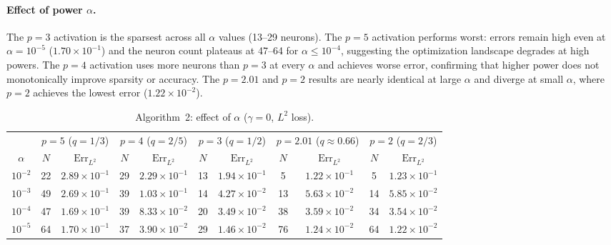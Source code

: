 \documentclass[12pt,fleqn]{amsart}
\theoremstyle{definition}
\begin{document}
\paragraph{\textbf{Effect of power $\alpha$}.}
The $p = 3$ activation is the sparsest across all $\alpha$ values (13--29 neurons).
The $p = 5$ activation performs worst: errors remain high even at $\alpha = 10^{-5}$ ($1.70 \times 10^{-1}$) and the neuron count plateaus at 47--64 for $\alpha \leqslant 10^{-4}$, suggesting the optimization landscape degrades at high powers.
The $p = 4$ activation uses more neurons than $p = 3$ at every $\alpha$ and achieves worse error, confirming that higher power does not monotonically improve sparsity or accuracy.
The $p = 2.01$ and $p = 2$ results are nearly identical at large $\alpha$ and diverge at small $\alpha$, where $p = 2$ achieves the lowest error ($1.22 \times 10^{-2}$).


\begin{table}[H]
\centering
\caption{Algorithm~2: effect of $\alpha$ ($\gamma = 0$, $L^2$ loss).}
\label{tab:alg2_alpha}
\begin{tabular}{c|cc|cc|cc|cc|cc}
\hline
 & \multicolumn{2}{c|}{$p = 5$ ($q = 1/3$)} & \multicolumn{2}{c|}{$p = 4$ ($q = 2/5$)} & \multicolumn{2}{c|}{$p = 3$ ($q = 1/2$)} & \multicolumn{2}{c|}{$p = 2.01$ ($q \approx 0.66$)} & \multicolumn{2}{c}{$p = 2$ ($q = 2/3$)} \\
$\alpha$ & $N$ & $\mathrm{Err}_{L^2}$ & $N$ & $\mathrm{Err}_{L^2}$ & $N$ & $\mathrm{Err}_{L^2}$ & $N$ & $\mathrm{Err}_{L^2}$ & $N$ & $\mathrm{Err}_{L^2}$ \\
\hline
$10^{-2}$ & 22 & $2.89 \times 10^{-1}$ & 29 & $2.29 \times 10^{-1}$ & 13 & $1.94 \times 10^{-1}$ & 5 & $1.22 \times 10^{-1}$ & 5 & $1.23 \times 10^{-1}$ \\
$10^{-3}$ & 49 & $2.69 \times 10^{-1}$ & 39 & $1.03 \times 10^{-1}$ & 14 & $4.27 \times 10^{-2}$ & 13 & $5.63 \times 10^{-2}$ & 14 & $5.85 \times 10^{-2}$ \\
$10^{-4}$ & 47 & $1.69 \times 10^{-1}$ & 39 & $8.33 \times 10^{-2}$ & 20 & $3.49 \times 10^{-2}$ & 38 & $3.59 \times 10^{-2}$ & 34 & $3.54 \times 10^{-2}$ \\
$10^{-5}$ & 64 & $1.70 \times 10^{-1}$ & 37 & $3.90 \times 10^{-2}$ & 29 & $1.46 \times 10^{-2}$ & 76 & $1.24 \times 10^{-2}$ & 64 & $1.22 \times 10^{-2}$ \\
\hline
\end{tabular}
\end{table}
\end{document}
